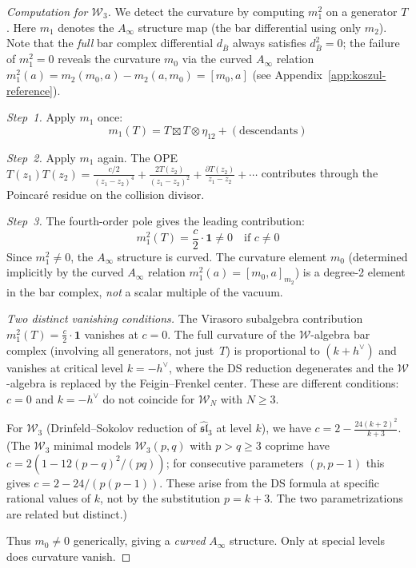 \begin{proof}[Computation for $\mathcal{W}_3$]
We detect the curvature by computing $m_1^2$ on a generator $T$.  Here $m_1$ denotes the $A_\infty$ structure map (the bar differential using only $m_2$).  Note that the \emph{full} bar complex differential $d_{\bar{B}}$ always satisfies $d_{\bar{B}}^2 = 0$; the failure of $m_1^2 = 0$ reveals the curvature $m_0$ via the curved $A_\infty$ relation $m_1^2(a) = m_2(m_0, a) - m_2(a, m_0) = [m_0, a]$ (see Appendix~\ref{app:koszul-reference}).

\emph{Step~1.} Apply $m_1$ once:
\begin{equation}
m_1(T) = T \boxtimes T \otimes \eta_{12} + (\text{descendants})
\end{equation}

\emph{Step~2.} Apply $m_1$ again.  The OPE $T(z_1)T(z_2) = \frac{c/2}{(z_1-z_2)^4} + \frac{2T(z_2)}{(z_1-z_2)^2} + \frac{\partial T(z_2)}{z_1-z_2} + \cdots$ contributes through the Poincar\'e residue on the collision divisor.

\emph{Step~3.} The fourth-order pole gives the leading contribution:
\begin{equation}
m_1^2(T) = \frac{c}{2} \cdot \mathbf{1} \neq 0 \quad \text{if } c \neq 0
\end{equation}
Since $m_1^2 \neq 0$, the $A_\infty$ structure is curved.  The curvature element $m_0$ (determined implicitly by the curved $A_\infty$ relation $m_1^2(a) = [m_0, a]_{m_2}$) is a degree-2 element in the bar complex, \emph{not} a scalar multiple of the vacuum.

\emph{Two distinct vanishing conditions.}  The Virasoro subalgebra contribution $m_1^2(T) = \frac{c}{2} \cdot \mathbf{1}$ vanishes at $c = 0$.  The full curvature of the $\mathcal{W}$-algebra bar complex (involving all generators, not just~$T$) is proportional to $(k + h^\vee)$ and vanishes at critical level $k = -h^\vee$, where the DS reduction degenerates and the $\mathcal{W}$-algebra is replaced by the Feigin--Frenkel center.  These are different conditions: $c = 0$ and $k = -h^\vee$ do not coincide for $\mathcal{W}_N$ with $N \geq 3$.

For $\mathcal{W}_3$ (Drinfeld--Sokolov reduction of $\widehat{\mathfrak{sl}}_3$ at level $k$), we have $c = 2 - \frac{24(k+2)^2}{k+3}$.  (The $\mathcal{W}_3$ minimal models $\mathcal{W}_3(p,q)$ with $p > q \geq 3$ coprime have $c = 2(1 - 12(p-q)^2/(pq))$; for consecutive parameters $(p, p-1)$ this gives $c = 2 - 24/(p(p-1))$.  These arise from the DS formula at specific rational values of $k$, not by the substitution $p = k+3$.  The two parametrizations are related but distinct.)

Thus $m_0 \neq 0$ generically, giving a \emph{curved} $A_\infty$ structure. Only at special levels does curvature vanish.
\end{proof}

